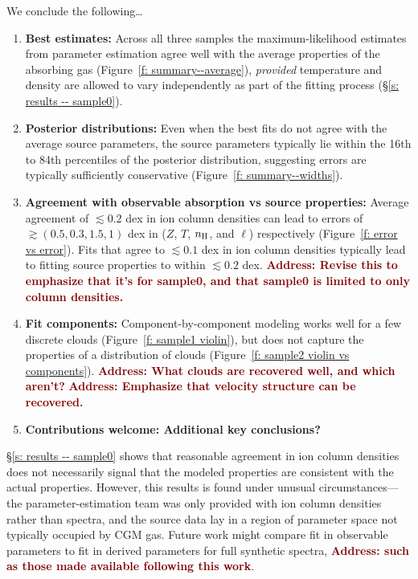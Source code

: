 \documentclass[fleqn,usenatbib]{mnras}
\newcommand{\thoughts}[1]{\textcolor{BurntOrange}{\textbf{Contributions welcome: #1}}}
\newcommand{\todo}[1]{\textcolor{Maroon}{\textbf{Address: #1}}}
\begin{document}
We conclude the following\ldots
\begin{enumerate}
    \item \textbf{Best estimates:} Across all three samples the maximum-likelihood estimates from parameter estimation agree well with the average properties of the absorbing gas (Figure~\ref{f: summary--average}), \textit{provided} temperature and density are allowed to vary independently as part of the fitting process (\S\ref{s: results -- sample0}).
    \item \textbf{Posterior distributions:} Even when the best fits do not agree with the average source parameters, the source parameters typically lie within the 16th to 84th percentiles of the posterior distribution, suggesting errors are typically sufficiently conservative (Figure~\ref{f: summary--widths}).
    \item \textbf{Agreement with observable absorption vs source properties:} Average agreement of $\lesssim 0.2$ dex in ion column densities can lead to errors of $\gtrsim (0.5, 0.3, 1.5, 1)$ dex in ($Z$, $T$, $n_{\rm H}$, and $\ell$) respectively (Figure~\ref{f: error vs error}). Fits that agree to $\lesssim 0.1$ dex in ion column densities typically lead to fitting source properties to within $\lesssim 0.2$ dex. \todo{Revise this to emphasize that it's for sample0, and that sample0 is limited to only column densities.}
    \item \textbf{Fit components:} Component-by-component modeling works well for a few discrete clouds (Figure~\ref{f: sample1 violin}), but does not capture the properties of a distribution of clouds (Figure~\ref{f: sample2 violin vs components}). \todo{What clouds are recovered well, and which aren't?}
    \todo{Emphasize that velocity structure can be recovered.}
    \item \thoughts{Additional key conclusions?}
\end{enumerate}

\S\ref{s: results -- sample0} shows that reasonable agreement in ion column densities does not necessarily signal that the modeled properties are consistent with the actual properties.
However, this results is found under unusual circumstances---the parameter-estimation team was only provided with ion column densities rather than spectra, and the source data lay in a region of parameter space not typically occupied by CGM gas.
Future work might compare fit in observable parameters to fit in derived parameters for full synthetic spectra,
\todo{such as those made available following this work}.
\end{document}
